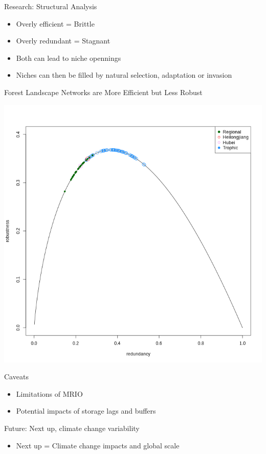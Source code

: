 \documentclass[ignorenonframetext,]{beamer}
\providecommand{\tightlist}{%
  \setlength{\itemsep}{0pt}\setlength{\parskip}{0pt}}
\begin{document}
\begin{frame}{Research: Structural Analysis}
\protect\hypertarget{research-structural-analysis-1}{}

\begin{itemize}
\tightlist
\item
  Overly efficient = Brittle
\item
  Overly redundant = Stagnant
\item
  Both can lead to niche opennings
\item
  Niches can then be filled by natural selection, adaptation or invasion
\end{itemize}

\end{frame}

\begin{frame}{Forest Landscape Networks are More Efficient but Less
Robust}
\protect\hypertarget{forest-landscape-networks-are-more-efficient-but-less-robust}{}

\begin{center}\includegraphics[width=0.5\linewidth]{images/for-rob-red} \end{center}

\end{frame}

\begin{frame}{Caveats}
\protect\hypertarget{caveats}{}

\begin{itemize}
\tightlist
\item
  Limitations of MRIO
\item
  Potential impacts of storage lags and buffers
\end{itemize}

\end{frame}

\begin{frame}{Future: Next up, climate change variability}
\protect\hypertarget{future-next-up-climate-change-variability}{}

\begin{itemize}
\tightlist
\item
  Next up = Climate change impacts and global scale
\end{itemize}

\end{frame}
\end{document}

